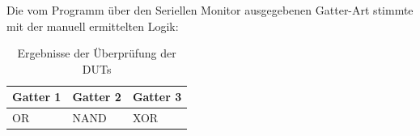 Die vom Programm über den Seriellen Monitor ausgegebenen Gatter-Art stimmte mit der manuell ermittelten Logik:

\begin{table}[h]
    \caption{Ergebnisse der Überprüfung der DUTs}
    \begin{tabularx}{\textwidth}{YYY}
        \toprule
        Gatter 1 & Gatter 2 & Gatter 3 \\ \midrule
        OR & NAND & XOR \\
        \bottomrule
    \end{tabularx}
\end{table}



